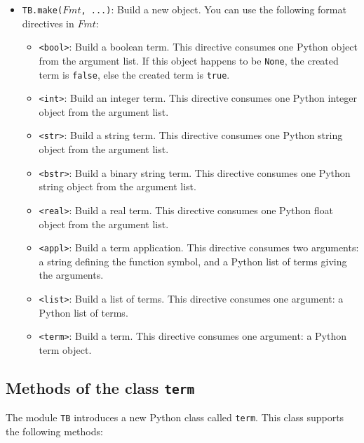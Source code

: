 \begin{itemize}
\item {\tt TB.make($Fmt$, ...)}: Build a new  object. You can use
      the following format directives in $Fmt$:
      \begin{itemize}
      \item {\tt <bool>}: Build a boolean term. This directive consumes
	one Python object from the argument list. If this object happens
	to be {\tt None}, the created term is {\tt false}, else the created
	term is {\tt true}.
      \item {\tt <int>}: Build an integer term. This directive consumes
	one Python integer object from the argument list.
      \item {\tt <str>}: Build a string term. This directive consumes one
	Python string object from the argument list.
      \item {\tt <bstr>}: Build a binary string term. 
        This directive consumes one Python string object from the argument 
        list.
      \item {\tt <real>}: Build a real term. This directive consumes one
	Python float object from the argument list.
      \item {\tt <appl>}: Build a term application. This directive consumes
	two arguments: a string defining the function symbol, and a Python list
	of terms giving the arguments.
      \item {\tt <list>}: Build a list of terms. This directive consumes
	one argument: a Python list of terms.
      \item {\tt <term>}: Build a term. This directive consumes one
        argument: a Python term object.
      \end{itemize}

\end{itemize}

\subsection{\label{term-methods}Methods of the class {\tt term}}

The module {\tt TB} introduces a new Python class called {\tt term}.
This class supports the following methods:

